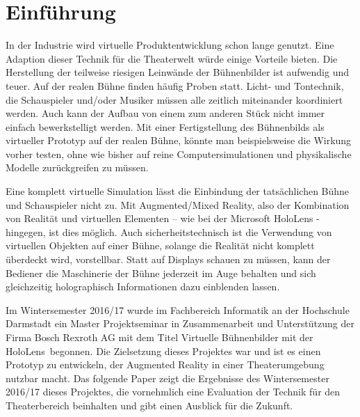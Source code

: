 \documentclass[conference, 11pt]{IEEEtran}
\begin{document}




%
\IEEEpeerreviewmaketitle




\section{Einführung}

In der Industrie wird virtuelle Produktentwicklung schon lange genutzt. Eine Adaption dieser Technik für die Theaterwelt würde einige Vorteile bieten.
Die Herstellung der teilweise riesigen Leinwände der Bühnenbilder ist aufwendig und teuer. Auf der realen Bühne finden häufig Proben statt. Licht- und Tontechnik, die Schauspieler und/oder Musiker müssen alle zeitlich miteinander koordiniert werden. Auch kann der Aufbau von einem zum anderen Stück nicht immer einfach bewerkstelligt werden. Mit einer Fertigstellung des Bühnenbilds als virtueller Prototyp auf der realen Bühne, könnte man beispielsweise die Wirkung vorher testen, ohne wie bisher auf reine Computersimulationen und physikalische Modelle zurückgreifen zu müssen. \par
Eine komplett virtuelle Simulation lässt die Einbindung der tatsächlichen Bühne und Schauspieler nicht zu. Mit Augmented/Mixed Reality, also der Kombination von Realität und virtuellen Elementen – wie bei der Microsoft HoloLens - hingegen, ist dies möglich. Auch sicherheitstechnisch ist die Verwendung von virtuellen Objekten auf einer Bühne, solange die Realität nicht komplett überdeckt wird, vorstellbar. Statt auf Displays schauen zu müssen, kann der Bediener die Maschinerie der Bühne jederzeit im Auge behalten und sich gleichzeitig holographisch Informationen dazu einblenden lassen. \par 
Im Wintersemester 2016/17 wurde im Fachbereich Informatik an der Hochschule Darmstadt ein Master Projektseminar in Zusammenarbeit und Unterstützung der Firma Bosch Rexroth AG mit dem Titel \glqq Virtuelle Bühnenbilder mit der HoloLens\grqq \, begonnen. Die Zielsetzung dieses Projektes war und ist es einen Prototyp zu entwickeln, der Augmented Reality in einer Theaterumgebung nutzbar macht. Das folgende Paper zeigt die Ergebnisse des Wintersemester 2016/17 dieses Projektes, die vornehmlich eine Evaluation der Technik für den Theaterbereich beinhalten und gibt einen Ausblick für die Zukunft.
\end{document}
